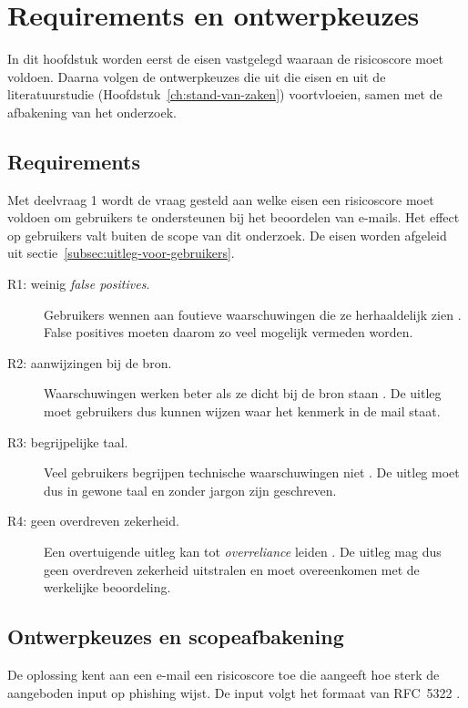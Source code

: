 \chapter{Requirements en ontwerpkeuzes}%
\label{ch:requirements}

In dit hoofdstuk worden eerst de eisen vastgelegd waaraan de risicoscore moet voldoen. Daarna volgen de ontwerpkeuzes die uit die eisen en uit de literatuurstudie (Hoofdstuk~\ref{ch:stand-van-zaken}) voortvloeien, samen met de afbakening van het onderzoek. 

\section{Requirements}%
\label{sec:requirements}

Met deelvraag 1 wordt de vraag gesteld aan welke eisen een risicoscore moet voldoen om gebruikers te ondersteunen bij het beoordelen van e-mails. Het effect op gebruikers valt buiten de scope van dit onderzoek. De eisen worden afgeleid uit sectie~\ref{subsec:uitleg-voor-gebruikers}.

\begin{description}
  \item[R1: weinig \emph{false positives}.] Gebruikers wennen aan foutieve waarschuwingen die ze herhaaldelijk zien \autocite{Anderson2015}. False positives moeten daarom zo veel mogelijk vermeden worden.
  \item[R2: aanwijzingen bij de bron.] Waarschuwingen werken beter als ze dicht bij de bron staan \autocite{Petelka2019}. De uitleg moet gebruikers dus kunnen wijzen waar het kenmerk in de mail staat.
  \item[R3: begrijpelijke taal.] Veel gebruikers begrijpen technische waarschuwingen niet \autocite{Egelman2008}. De uitleg moet dus in gewone taal en zonder jargon zijn geschreven.
  \item[R4: geen overdreven zekerheid.] Een overtuigende uitleg kan tot \emph{overreliance} leiden \autocite{Bucinca2021}. De uitleg mag dus geen overdreven zekerheid uitstralen en moet overeenkomen met de werkelijke beoordeling.
\end{description}

\section{Ontwerpkeuzes en scopeafbakening}%
\label{sec:afbakening-scope}

De oplossing kent aan een e-mail een risicoscore toe die aangeeft hoe sterk de aangeboden input op phishing wijst. De input volgt het formaat van RFC~5322 \autocite{Resnick2008}.

